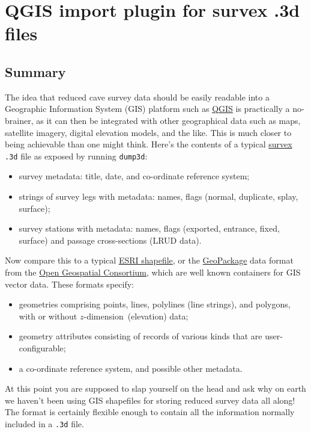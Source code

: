 \documentclass[]{article}
\providecommand{\tightlist}{%
  \setlength{\itemsep}{0pt}\setlength{\parskip}{0pt}}
\newcommand{\zdimension}{$z$-dimension}
\begin{document}
\section{QGIS import plugin for survex .3d files}

\subsection{Summary}\label{summary}

The idea that reduced cave survey data should be easily readable into a
Geographic Information System (GIS) platform such as
\href{http://www.qgis.org/}{QGIS} is practically a no-brainer, as it can
then be integrated with other geographical data such as maps, satellite
imagery, digital elevation models, and the like. This is much closer
to being achievable than one might think. Here's the contents of a
typical \href{https://survex.com/}{survex} \verb}.3d} file as exposed
by running \verb}dump3d}:

\begin{itemize}
\tightlist
\item
  survey metadata: title, date, and co-ordinate reference system;
\item
  strings of survey legs with metadata: names, flags (normal, duplicate,
  splay, surface);
\item
  survey stations with metadata: names, flags (exported, entrance,
  fixed, surface) and passage cross-sections (LRUD data).
\end{itemize}

Now compare this to a typical
\href{https://en.wikipedia.org/wiki/Shapefile}{ESRI shapefile}, or the
\href{https://en.wikipedia.org/wiki/GeoPackage}{GeoPackage} data format
from the
\href{https://en.wikipedia.org/wiki/Open_Geospatial_Consortium}{Open
Geospatial Consortium}, which are well known containers for GIS vector
data. These formats specify:

\begin{itemize}
\tightlist
\item
  geometries comprising points, lines, polylines (line strings), and
  polygons, with or without \zdimension\ (elevation) data;
\item
  geometry attributes consisting of records of various kinds that are
  user-configurable;
\item
  a co-ordinate reference system, and possible other metadata.
\end{itemize}

At this point you are supposed to slap yourself on the head and ask
why on earth we haven't been using GIS shapefiles for storing reduced
survey data all along! The format is certainly flexible enough to
contain all the information normally included in a \verb}.3d} file.
\end{document}
